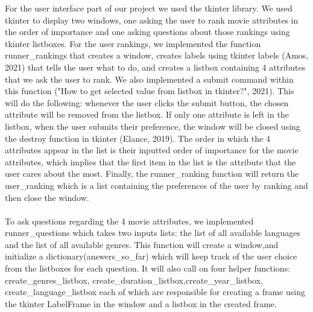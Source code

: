 \documentclass[fontsize=11pt]{article}
\begin{document}
For the user interface part of our project we used the tkinter library. We used tkinter to display two windows, one asking the user to rank movie attributes in the order of importance and one asking questions about those rankings using tkinter listboxes. For the user rankings, we implemented the function runner\_rankings that creates a window, creates labels using tkinter labels (Amos, 2021) that tells the user what to do, and creates a listbox containing 4 attributes that we ask the user to rank. We also implemented a submit command within this function ("How to get selected value from listbox in tkinter?", 2021). This will do the following: whenever the user clicks the submit button, the chosen attribute will be removed from the listbox. If only one attribute is left in the listbox, when the user submits their preference, the window will be closed using the destroy function in tkinter (Elance, 2019). The order in which the 4 attributes appear in the list is their inputted order of importance for the movie attributes, which implies that the first item in the list is the attribute that the user cares about the most. Finally, the runner\_ranking function will return the user\_ranking which is a list containing the preferences of the user by ranking and then close the window.
\\\\
To ask questions regarding the 4 movie attributes, we implemented runner\_questions which takes two inputs lists: the list of all available languages and the list of all available genres. This function will create a window,and initialize a dictionary(answers\_so\_far) which will keep track of the user choice from the listboxes for each question. It will also call on four helper functions: create\_genres\_listbox, create\_duration\_listbox,create\_year\_listbox, create\_language\_listbox each of which are responsible for creating a frame using the tkinter LabelFrame in the window and a listbox in the created frame.\\
\end{document}
